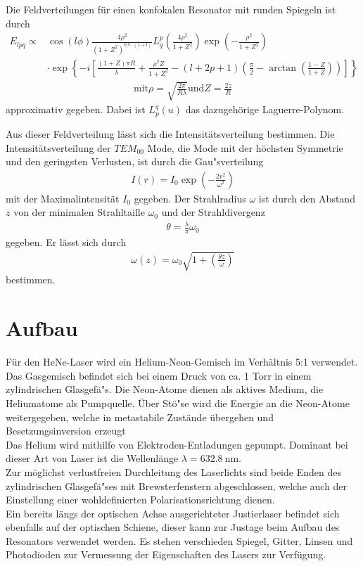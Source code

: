 \documentclass[]{scrartcl}
\begin{document}
Die Feldverteilungen für einen konfokalen Resonator mit runden Spiegeln ist durch
\begin{align*}
 E_{lpq} \propto &\cos \left(l \phi \right) \frac{4\rho^ 2}{\left(1+Z^2 \right)^{0.5\cdot \left(1+l\right)}}L_{q}^{p}\left( \frac{4\rho^2}{1+Z^2} \right)\exp \left(-\frac{\rho^2}{1+Z^2}\right) \\
&\cdot\exp \left\{-i \left[ \frac{\left(1+Z \right)\pi R}{\lambda} + \frac{\rho^2Z}{1+Z^2} - \left(l+2p+1\right)\left(\frac{\pi}{2}-\arctan \left(\frac{1-Z}{1+Z}\right) \right) \right] \right\}
\end{align*}
\begin{align*}
\text{mit} \rho= \sqrt{\frac{2\pi}{R\lambda}} \text{und} Z=\frac{2z}{R}
\end{align*}
approximativ gegeben. Dabei ist $L^{q}_{p}\left(u\right) $ das dazugehörige Laguerre-Polynom.

Aus dieser Feldverteilung lässt sich die Intensitätsverteilung bestimmen. Die Intensitätsverteilung der $TEM_{00}$ Mode, die Mode mit der höchsten Symmetrie und den geringsten Verlusten, ist durch die Gau"sverteilung
\begin{align}
 I\left(r\right)=I_0\exp \left(-\frac{2r^2}{\omega^2}\right)
 \label{eq:tem00}
\end{align}
mit der Maximalintensität $I_0$ gegeben. Der Strahlradius $\omega$ ist durch den Abstand $z$ von der minimalen Strahltaille $\omega_0$ und der Strahldivergenz 
\begin{align}
 \theta = \frac{\lambda}{\pi}\omega_0
\end{align}
gegeben. Er lässt sich durch
\begin{align}
 \omega\left(z\right)=\omega_0\sqrt{1+\left(\frac{\theta z}{\omega}\right)}
\end{align}
bestimmen. 

\section{Aufbau}
Für den HeNe-Laser wird ein Helium-Neon-Gemisch im Verhältnis 5:1 verwendet. Das Gasgemisch befindet sich bei einem Druck von ca. 1 Torr in einem zylindrischen Glasgefä"s. Die Neon-Atome dienen als aktives Medium, die Heliumatome als Pumpquelle. Über Stö"se wird die Energie an die Neon-Atome weitergegeben, welche in metastabile Zustände übergehen und Besetzungsinversion erzeugt \\
Das Helium wird mithilfe von Elektroden-Entladungen gepumpt. Dominant bei dieser Art von Laser ist die Wellenlänge $\lambda=\SI{632.8}{\nano\metre}$.\\
Zur möglichst verlustfreien Durchleitung des Laserlichts sind beide Enden des zylindrischen Glasgefä"ses mit Brewsterfenstern abgeschlossen, welche auch der Einstellung einer wohldefinierten Polarisationsrichtung dienen. \\
Ein bereits längs der optischen Achse ausgerichteter Justierlaser befindet sich ebenfalls auf der optischen Schiene, dieser kann zur Justage beim Aufbau des Resonators verwendet werden. Es stehen verschieden Spiegel, Gitter, Linsen und Photodioden zur Vermessung der Eigenschaften des Lasers zur Verfügung. 
\end{document}

